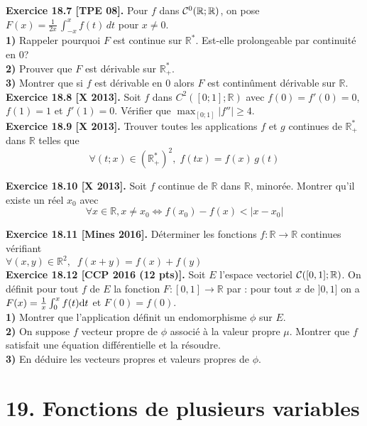 \documentclass[a4paper,12pt,francais]{article}
\newcommand{\field}[1]{\mathbb{#1}}
\newcommand{\R}{\field{R}}
\begin{document}
 \noindent
 {\bf Exercice 18.7 [TPE 08].} Pour $f$ dans ${\cal{C}}^0(\R;\R)$, on pose $F(x)=\frac{1}{2x}\, \int_{-x}^x f(t)\, dt$ pour $x\neq 0$.\\
 {\bf 1)} Rappeler pourquoi $F$ est continue sur $\R^*$. Est-elle prolongeable par continuité en $0$?\\
 {\bf 2)} Prouver que $F$ est dérivable sur $\R_+^*$.\\
 {\bf 3)} Montrer que si $f$ est dérivable en $0$ alors $F$ est continûment dérivable sur $\R$.\\
 
\noindent
{\bf Exercice 18.8 [X 2013].} Soit $f$ dans $C^2([0;1];\R)$ avec $f(0)=f'(0)=0$, $f(1)=1$ et $f'(1)=0$. Vérifier que $\displaystyle \max_{[0;1]} |f''| \geqslant 4$.\\

\noindent
{\bf Exercice 18.9 [X 2013].}
Trouver toutes les applications $f$ et $g$ continues de $\R_+^*$ dans $\R$ telles que \\
$$\forall (t;x)\in (\R_+^*)^2,\; f(tx)=f(x)\, g(t)$$ 

\noindent
{\bf Exercice 18.10 [X 2013].} Soit $f$ continue de $\R$ dans $\R$, minorée. Montrer qu'il existe un réel $x_0$ avec 
$$ \forall x \in \R, x\neq x_0 \Longleftrightarrow f(x_0)-f(x) <|x-x_0|$$ 

\noindent
{\bf Exercice 18.11 [Mines 2016].}
Déterminer les fonctions $f : \R \to \R$ continues vérifiant \\
$\forall (x, y) \in \R^2,\; \;  f (x + y) = f (x) + f (y)$\\

\noindent
{\bf Exercice 18.12 [CCP 2016 (12 pts)].}
Soit $E$ l'espace vectoriel ${\cal{C}}([0,1];\R)$. On définit pour tout $f$ de $E$ la fonction $F : [0,1] \to \R$ par : pour tout $x$ de $]0,1]$ on a 
$F(x)=\frac{1}{x}\int_0^x f(t) {\rm d}t $ et $F(0)=f(0)$.\\
{\bf 1)} Montrer que l'application définit un endomorphisme $\phi$ sur $E$.\\
{\bf 2)} On suppose $f$ vecteur propre de $\phi$ associé à la valeur propre $\mu$. Montrer que $f$ satisfait une équation différentielle et la résoudre.\\
{\bf 3)} En déduire les vecteurs propres et valeurs propres de $\phi$.\\

\newpage
\section*{19. Fonctions de plusieurs variables} %
\end{document}
